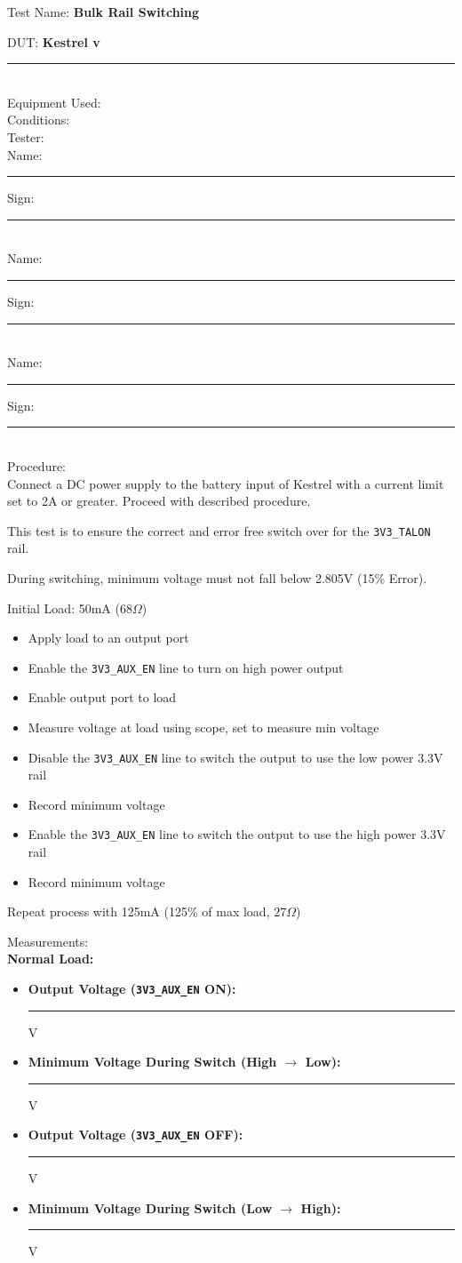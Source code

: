 \pagebreak
{\Huge Test Name: \textbf{Bulk Rail Switching}}\\[20pt]
{\Large DUT: \textbf{Kestrel v}\rule{1cm}{0.15mm}}\\[10pt]
{\Large Equipment Used: }\\[40pt]
{\Large Conditions: }\\[40pt]
{\Large Tester: }\\[10pt]
Name: \rule{4cm}{0.15mm} \hfill Sign: \rule{4cm}{0.15mm}\\[5pt]
Name: \rule{4cm}{0.15mm} \hfill Sign: \rule{4cm}{0.15mm}\\[5pt]
Name: \rule{4cm}{0.15mm} \hfill Sign: \rule{4cm}{0.15mm}\\[15pt]
{\Large Procedure: }\\
Connect a DC power supply to the battery input of Kestrel with a current limit set to 2A or greater. Proceed with described procedure. 

This test is to ensure the correct and error free switch over for the \texttt{3V3\_TALON} rail. 

During switching, minimum voltage must not fall below 2.805V (15\% Error).


Initial Load: 50mA ($68\Omega$)

\begin{itemize}
\item Apply load to an output port
\item Enable the \texttt{3V3\_AUX\_EN} line to turn on high power output
\item Enable output port to load
\item Measure voltage at load using scope, set to measure min voltage
\item Disable the \texttt{3V3\_AUX\_EN} line to switch the output to use the low power 3.3V rail
\item Record minimum voltage
\item Enable the \texttt{3V3\_AUX\_EN} line to switch the output to use the high power 3.3V rail
\item Record minimum voltage
\end{itemize}

Repeat process with 125mA (125\% of max load, $27\Omega$)

{\Large Measurements:}\\
\textbf{Normal Load:}\\
\begin{itemize}
\item \textbf{Output Voltage (\texttt{3V3\_AUX\_EN} ON):} \rule{3cm}{0.15mm} V
\item \textbf{Minimum Voltage During Switch (High $\rightarrow$ Low):} \rule{3cm}{0.15mm} V
\item \textbf{Output Voltage (\texttt{3V3\_AUX\_EN} OFF):} \rule{3cm}{0.15mm} V
\item \textbf{Minimum Voltage During Switch (Low $\rightarrow$ High):} \rule{3cm}{0.15mm} V
\end{itemize}

